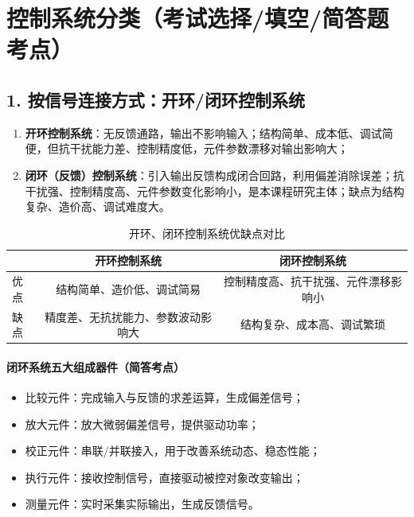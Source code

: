 \section{控制系统分类（考试选择/填空/简答题考点）}
\subsection{1. 按信号连接方式：开环/闭环控制系统}
\begin{enumerate}
    \item \textbf{开环控制系统}：无反馈通路，输出不影响输入；结构简单、成本低、调试简便，但抗干扰能力差、控制精度低，元件参数漂移对输出影响大；
    \item \textbf{闭环（反馈）控制系统}：引入输出反馈构成闭合回路，利用偏差消除误差；抗干扰强、控制精度高、元件参数变化影响小，是本课程研究主体；缺点为结构复杂、造价高、调试难度大。
\end{enumerate}

\begin{table}[htbp]
\centering
\caption{开环、闭环控制系统优缺点对比}
\begin{tabular}{@{}lcc@{}}
\toprule
& 开环控制系统 & 闭环控制系统 \\
\midrule
优点 & 结构简单、造价低、调试简易 & 控制精度高、抗干扰强、元件漂移影响小 \\
缺点 & 精度差、无抗扰能力、参数波动影响大 & 结构复杂、成本高、调试繁琐 \\
\bottomrule
\end{tabular}
\end{table}

\paragraph{闭环系统五大组成器件（简答考点）}
\begin{itemize}
    \item 比较元件：完成输入与反馈的求差运算，生成偏差信号；
    \item 放大元件：放大微弱偏差信号，提供驱动功率；
    \item 校正元件：串联/并联接入，用于改善系统动态、稳态性能；
    \item 执行元件：接收控制信号，直接驱动被控对象改变输出；
    \item 测量元件：实时采集实际输出，生成反馈信号。
\end{itemize}

